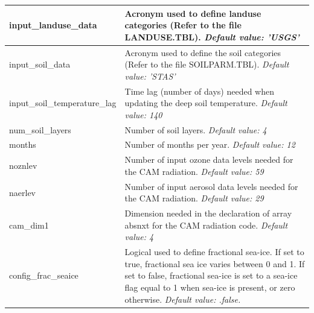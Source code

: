 \documentclass[11pt]{report}
\begin{document}
{\small
\begin{longtable}{|p{2.0in} |p{4.25in}|}
 \hline
  input\_landuse\_data         &   Acronym used to define landuse categories \hfill\break (Refer to the file LANDUSE.TBL). \newline 
  {\em Default value: 'USGS'} \\ \hline

  input\_soil\_data         &  Acronym used to define the soil categories \hfill\break (Refer to the file SOILPARM.TBL).  \newline 
  {\em Default value: 'STAS'} \\ \hline  

  input\_soil\_temperature\_lag &  Time lag (number of days) needed when updating the deep soil temperature.  \newline 
  {\em Default value: 140} \\ \hline

  num\_soil\_layers         & Number of soil layers. \newline 
  {\em Default value: 4} \\ \hline 
  
  months         &  Number of months per year. \newline 
  {\em Default value: 12} \\ \hline   
  
  noznlev         &  Number of input ozone data levels needed for the CAM radiation. \newline 
  {\em Default value: 59} \\ \hline
  
  naerlev         &  Number of input aerosol data levels needed for the CAM radiation.  \newline 
  {\em Default value: 29} \\ \hline
  
  cam\_dim1         &  Dimension needed in the declaration of array absnxt for the CAM radiation code. \newline 
  {\em Default value: 4} \\ \hline
         
  config\_frac\_seaice &  Logical used to define fractional sea-ice. If set to true, fractional sea ice varies between 0 and 1. If set to false, fractional sea-ice is set to a sea-ice flag equal to 1 when sea-ice is present, or zero otherwise. \newline 
  {\em Default value: .false.} \\ \hline


\end{longtable}}
\end{document}

